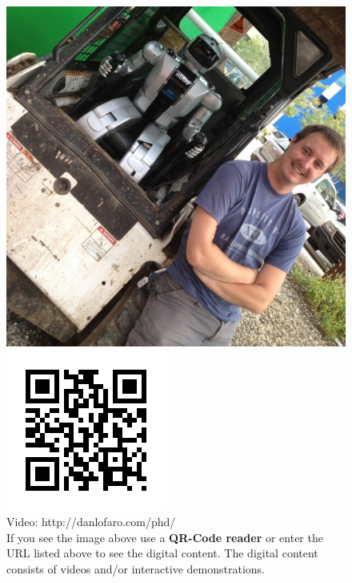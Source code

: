 \begin{figure}
  \centering
      \includegraphics[width=0.69\columnwidth]{./pix/danAndHubo.jpg}
      \includegraphics[width=0.3\columnwidth]{./qrcode/qrcode-phd.png}\\
      Video: http://danlofaro.com/phd/ \\
If you see the image above use a \textbf{QR-Code reader} or enter the URL listed above to see the digital content.  The digital content consists of videos and/or interactive demonstrations.
\end{figure}
